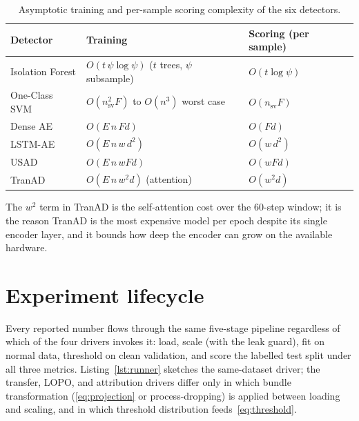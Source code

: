 \begin{table}[h]
\centering
\caption{Asymptotic training and per-sample scoring complexity of the six detectors.}
\label{tab:complexity}
\small
\begin{tabular}{lll}
\toprule
Detector & Training & Scoring (per sample) \\
\midrule
Isolation Forest & $O(t\, \psi \log \psi)$ ($t$ trees, $\psi$ subsample) & $O(t \log \psi)$ \\
One-Class SVM    & $O(n_{\mathrm{sv}}^2 F)$ to $O(n^3)$ worst case & $O(n_{\mathrm{sv}} F)$ \\
Dense AE         & $O(E\, n\, F d)$ & $O(F d)$ \\
LSTM-AE          & $O(E\, n\, w\, d^2)$ & $O(w\, d^2)$ \\
USAD             & $O(E\, n\, w F d)$ & $O(w F d)$ \\
TranAD           & $O(E\, n\, w^2 d)$ (attention) & $O(w^2 d)$ \\
\bottomrule
\end{tabular}
\end{table}

The $w^2$ term in TranAD is the self-attention cost over the $60$-step window; it is the reason TranAD is the most expensive model per epoch despite its single encoder layer, and it bounds how deep the encoder can grow on the available hardware.

\section{Experiment lifecycle}
\label{sec:lifecycle}

Every reported number flows through the same five-stage pipeline regardless of which of the four drivers invokes it: load, scale (with the leak guard), fit on normal data, threshold on clean validation, and score the labelled test split under all three metrics.  Listing~\ref{lst:runner} sketches the same-dataset driver; the transfer, LOPO, and attribution drivers differ only in which bundle transformation (\eqref{eq:projection} or process-dropping) is applied between loading and scaling, and in which threshold distribution feeds~\eqref{eq:threshold}.

